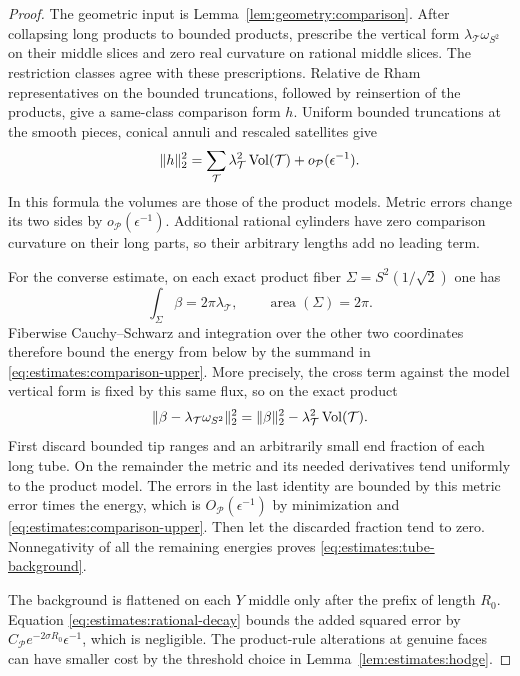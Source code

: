 \begin{proof}
The geometric input is Lemma~\ref{lem:geometry:comparison}.  After
collapsing long products to bounded products, prescribe the vertical
form $\lambda_{\mathcal T}\omega_{S^2}$ on their middle slices and zero
real curvature on rational middle slices.  The restriction classes
agree with these prescriptions.  Relative de Rham representatives on
the bounded truncations, followed by reinsertion of the products,
give a same-class comparison form $h$.  Uniform bounded truncations
at the smooth pieces, conical annuli and rescaled satellites give
\begin{equation}
 \|h\|_2^2
  =\sum_{\mathcal T}\lambda_{\mathcal T}^2\operatorname{Vol}(\mathcal T)
       +o_{\mathcal P}(\epsilon^{-1}).
 \label{eq:estimates:comparison-upper}
\end{equation}
In this formula the volumes are those of the product models.  Metric
errors change its two sides by $o_{\mathcal P}(\epsilon^{-1})$.
Additional rational cylinders have zero comparison curvature on
their long parts, so their arbitrary lengths add no leading term.

For the converse estimate, on each exact product fiber
$\Sigma=S^2(1/\sqrt2)$ one has
\[
       \int_\Sigma\beta=2\pi\lambda_{\mathcal T},\qquad
       \operatorname{area}(\Sigma)=2\pi.
\]
Fiberwise Cauchy--Schwarz and integration over the other two
coordinates therefore bound the energy from below by the summand
in \eqref{eq:estimates:comparison-upper}.  More precisely, the cross
term against the model vertical form is fixed by this same flux, so
on the exact product
\[
 \|\beta-\lambda_{\mathcal T}\omega_{S^2}\|_2^2
       =\|\beta\|_2^2-
                    \lambda_{\mathcal T}^2\operatorname{Vol}(\mathcal T).
\]
First discard bounded tip ranges and an arbitrarily small end
fraction of each long tube.  On the remainder the metric and its
needed derivatives tend uniformly to the product model.  The errors
in the last identity are bounded by this metric error times the
energy, which is $O_{\mathcal P}(\epsilon^{-1})$ by minimization and
\eqref{eq:estimates:comparison-upper}.  Then let the discarded
fraction tend to zero.  Nonnegativity of all the remaining energies
proves \eqref{eq:estimates:tube-background}.

The background is flattened on each $Y$ middle only after the
prefix of length $R_0$.  Equation
\eqref{eq:estimates:rational-decay} bounds the added squared error
by $C_{\mathcal P}e^{-2\sigma R_0}\epsilon^{-1}$, which is negligible.
The product-rule alterations at genuine faces can have smaller
cost by the threshold choice in Lemma~\ref{lem:estimates:hodge}.


\end{proof}

